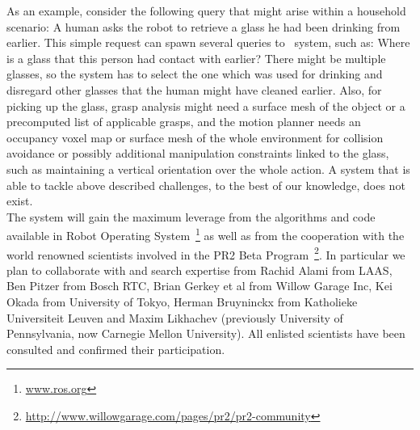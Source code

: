 As an example, consider the following query that might arise within a
household scenario: A human asks the robot to retrieve a glass he had
been drinking from earlier. This simple request can spawn several queries to
\ksem\ system, such as: Where is a glass that this person had contact with earlier?
There might be multiple glasses, so the system has to select the one
which was used for drinking and disregard other glasses that the human
might have cleaned earlier. Also, for picking up the glass, grasp
analysis might need a surface mesh of the object or a precomputed list
of applicable grasps, and the motion planner needs an occupancy voxel
map or surface mesh of the whole environment for collision avoidance or
possibly additional manipulation constraints linked to the glass, such
as maintaining a vertical orientation over the whole action.
A system that is able to tackle above described challenges, to the best of our
knowledge, does not exist.\\
The system will gain the maximum leverage from the algorithms and code available
in Robot Operating System~\footnote{\url{www.ros.org}} as well as from the cooperation
with the world renowned scientists involved in the PR2 Beta Program~\footnote{\url{http://www.willowgarage.com/pages/pr2/pr2-community}}.
In particular we plan to collaborate with and search expertise from Rachid Alami from LAAS, 
Ben Pitzer from Bosch RTC, Brian Gerkey et al from Willow Garage Inc, 
Kei Okada from University of Tokyo, Herman  Bruyninckx from Katholieke Universiteit Leuven and Maxim Likhachev 
(previously University of Pennsylvania, now Carnegie Mellon University).
All enlisted scientists have been consulted and confirmed their participation.
